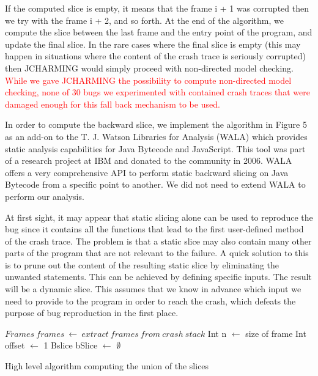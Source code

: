 \documentclass[times]{smrauth}
\newcommand{\red}[1]{\textcolor{red}{#1}}
\begin{document}
If the computed slice is empty, it means that the frame i + 1
was corrupted then we try with the frame i + 2, and so forth.
At the end of the algorithm, we compute the slice between the
last frame and the entry point of the program, and update the
final slice. In the rare cases where the final slice is empty (this
may happen in situations where the content of the crash trace
is seriously corrupted) then JCHARMING would simply
proceed with non-directed model checking. 
\red{While we gave JCHARMING the possibility to compute non-directed model 
checking, none of 30 bugs we experimented with contained crash traces
that were damaged enough for this fall back mechanism to be used.}

In order to compute the backward slice, we implement the
algorithm in Figure 5 as an add-on to the T. J. Watson
Libraries for Analysis (WALA) \cite{IBM2006} which provides static
analysis capabilities for Java Bytecode and JavaScript. This
tool was part of a research project at IBM and donated to the
community in 2006. WALA offers a very comprehensive API
to perform static backward slicing on Java Bytecode from a
specific point to another.
We did not need to extend WALA to perform our 
analysis.

At first sight, it may appear that static slicing alone can be
used to reproduce the bug since it contains all the functions
that lead to the first user-defined method of the crash trace.
The problem is that a static slice may also contain many other
parts of the program that are not relevant to the failure. A
quick solution to this is to prune out the content of the
resulting static slice by eliminating the unwanted statements.
This can be achieved by defining specific inputs. The result
will be a dynamic slice. This assumes that we know in
advance which input we need to provide to the program in
order to reach the crash, which defeats the purpose of bug
reproduction in the first place. \\


\begin{algorithm}[H]
 $Frames~frames~\leftarrow~extract~frames~from~crash~stack$\;
 Int n $\leftarrow$ size of frame\;
 Int offset $\leftarrow$ 1\;
 Bslice bSlice $\leftarrow$ $\emptyset$\;
\caption{High level algorithm computing the union of the slices\label{alg:jcharming-slice}}
\end{algorithm}
\end{document}
